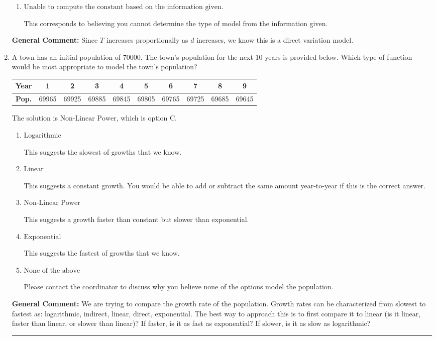 \documentclass{extbook}[14pt]
\newcommand{\litem}[1]{\item #1

\rule{\textwidth}{0.4pt}}
\begin{document}
\begin{enumerate}
{\begin{enumerate}[label=\Alph*.]
This corresponds to the model $T^{1/3} = k d^{1/3}$.
\item \( \text{Unable to compute the constant based on the information given.} \)

This corresponds to believing you cannot determine the type of model from the information given.
\end{enumerate}

\textbf{General Comment:} Since $T$ increases proportionally as $d$ increases, we know this is a direct variation model.
}
\litem{
A town has an initial population of 70000. The town's population for the next 10 years is provided below. Which type of function would be most appropriate to model the town's population?



\begin{tabular}{c|c|c|c|c|c|c|c|c|c}
\textbf{Year} & 1 & 2 & 3 & 4 & 5 & 6 & 7 & 8 & 9 \tabularnewline
\hline
\textbf{Pop.} & 69965 & 69925 & 69885 & 69845 & 69805 & 69765 & 69725 & 69685 & 69645
\end{tabular} 

The solution is \( \text{Non-Linear Power} \), which is option C.\begin{enumerate}[label=\Alph*.]
\item \( \text{Logarithmic} \)

This suggests the slowest of growths that we know.
\item \( \text{Linear} \)

This suggests a constant growth. You would be able to add or subtract the same amount year-to-year if this is the correct answer.
\item \( \text{Non-Linear Power} \)

This suggests a growth faster than constant but slower than exponential.
\item \( \text{Exponential} \)

This suggests the fastest of growths that we know.
\item \( \text{None of the above} \)

Please contact the coordinator to discuss why you believe none of the options model the population.
\end{enumerate}

\textbf{General Comment:} We are trying to compare the growth rate of the population. Growth rates can be characterized from slowest to fastest as: logarithmic, indirect, linear, direct, exponential. The best way to approach this is to first compare it to linear (is it linear, faster than linear, or slower than linear)? If faster, is it as fast as exponential? If slower, is it as slow as logarithmic?
}
\end{enumerate}
\end{document}

